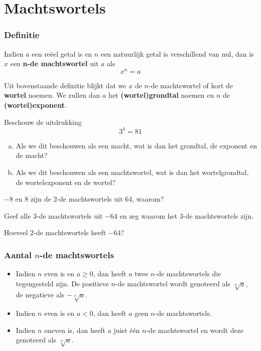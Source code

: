\documentclass[12pt,twoside,a4paper]{article}
\begin{document}
\cleardoublepage
\section{Machtswortels}

\subsubsection*{Definitie}
\begin{mdframed}
Indien $a$ een reëel getal is en $n$ een natuurlijk getal is verschillend van nul, dan is $x$ een {\bf n-de machtswortel} uit $a$ als
$$x^n=a$$
\end{mdframed}

Uit bovenstaande definitie blijkt dat we $x$ de $n$-de machtswortel of kort de {\bf wortel} noemen. We zullen dan $a$ het {\bf (wortel)grondtal} noemen en $n$ de {\bf (wortel)exponent}.

\begin{oefening}
  Beschouw de uitdrukking
  $$ 3^4=81 $$
  \begin{enumerate}[(a)]
  \item Als we dit beschouwen als een macht, wat is dan het grondtal, de exponent en de macht?
    \item Als we dit beschouwen als een machtswortel, wat is dan het wortelgrondtal, de wortelexponent en de wortel?
  \end{enumerate}
\end{oefening}

\begin{oefening}
$-8$ en $8$ zijn de 2-de machtswortels uit $64$, waarom?
\end{oefening}

\begin{oefening}
Geef alle $3$-de machtswortels uit $-64$ en zeg waarom het $3$-de machtswortels zijn.
\end{oefening}

\begin{oefening}
Hoeveel $2$-de machtswortels heeft $-64$?
\end{oefening}

\subsubsection*{Aantal $n$-de machtswortels}
\begin{mdframed}
\begin{itemize}
  \item Indien $n$ even is en $a\geq 0$, dan heeft $a$ twee $n$-de machtswortels die tegengesteld zijn. De positieve $n$-de machtswortel wordt genoteerd als $\sqrt[n]{a}$, de negatieve als $-\sqrt[n]{a}$.
  \item Indien $n$ even is en $a < 0$, dan heeft $a$ geen $n$-de machtswortels.
  \item Indien $n$ oneven is, dan heeft $a$ juist één $n$-de machtswortel en wordt deze genoteerd als $\sqrt[n]{a}$.
\end{itemize}
\end{mdframed}
\end{document}
